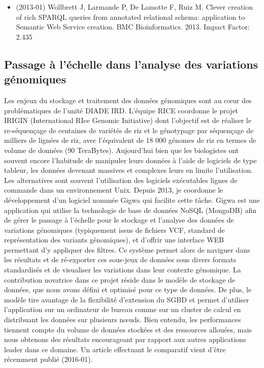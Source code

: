 \begin{itemize}

\item (2013-01) Wollbrett J, Larmande P, De Lamotte F, Ruiz M. Clever creation of rich SPARQL queries from annotated relational schema: application to Semantic Web Service creation. BMC Bioinformatics. 2013. Impact Factor: 2.435
\end{itemize}

\subsection*{Passage à l’échelle dans l’analyse des variations génomiques}
\label{GIGWA}

Les enjeux du stockage et traitement des données génomiques sont au cœur des problématiques de l’unité DIADE IRD. L’équipe RICE coordonne le projet IRIGIN (International RIce Genomic Initiative) dont l’objectif est de réaliser le re-séquençage de centaines de variétés de riz et le génotypage par séquençage de milliers de lignées de riz, avec l’équivalent de 18 000 génomes de riz en termes de volume de données (90 TeraBytes). Aujourd'hui bien que les biologistes ont souvent encore l'habitude de manipuler leurs données à l'aide de logiciels de type tableur, les données devenant massives et complexes leurs en limite l'utilisation. Les alternatives sont souvent l’utilisation des logiciels exécutables lignes de commande dans un environnement Unix.
Depuis 2013, je coordonne le développement d’un logiciel nommée Gigwa qui facilite cette tâche. Gigwa est une application qui utilise la technologie de base de données NoSQL (MongoDB) afin de gérer le passage à l’échelle pour le stockage et l’analyse des données de variations génomiques (typiquement issus de fichiers VCF, standard de représentation des variants génomiques), et d’offrir une interface WEB permettant d’y appliquer des filtres. Ce système permet alors de naviguer dans les résultats et de ré-exporter ces sous-jeux de données sous divers formats standardisés et de visualiser les variations dans leur contexte génomique. La contribution novatrice dans ce projet réside dans le modèle de stockage de données, que nous avons défini et optimisé pour ce type de données. De plus, le modèle tire avantage de la flexibilité d’extension du SGBD et permet d’utiliser l’application sur un ordinateur de bureau comme sur un cluster de calcul en distribuant les données sur plusieurs nœuds. Bien entendu, les performances tiennent compte du volume de données stockées et des ressources allouées, mais nous obtenons des résultats encourageant par rapport aux autres applications leader dans ce domaine. Un article effectuant le comparatif vient d’être récemment publié (2016-01).


